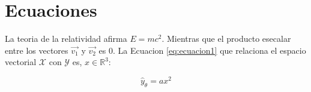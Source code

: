 \section{Ecuaciones}
La teoria de la relatividad afirma $E = mc^{2}$. Mientras que el producto esecalar entre los vectores $\vec{v_{1}}$ y $\vec{v_{2}}$ es 0. La Ecuacion \eqref{eq:ecuacion1} que relaciona el espacio vectorial $\mathcal{X}$ con $\mathcal{Y}$ es, $x \in \mathbb{R}^{3}$:

\begin{equation}
    \label{eq:ecuacion1}
    \hat{y}_{\theta} = ax^{2}
\end{equation}
